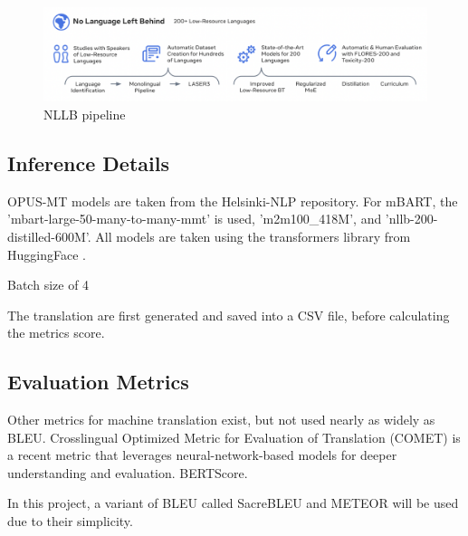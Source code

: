 \documentclass[a4paper]{article}
\begin{document}
\begin{figure}[htbp]
    \centering
    \includegraphics[width=0.9\linewidth]{images/nllb.png}
    \caption{NLLB pipeline \cite{nllb200-2020}}
    \label{fig:nllb}
\end{figure}


\subsection{Inference Details}

OPUS-MT models are taken from the Helsinki-NLP repository. For mBART, the 'mbart-large-50-many-to-many-mmt' is used, 'm2m100\_418M', and 'nllb-200-distilled-600M'. All models are taken using the transformers \cite{wolf-etal-2020-transformers} library from HuggingFace \cite{huggingface}.

Batch size of 4

The translation are first generated and saved into a CSV file, before calculating the metrics score.



\subsection{Evaluation Metrics}

Other metrics for machine translation exist, but not used nearly as widely as BLEU. Crosslingual Optimized Metric for Evaluation of Translation (COMET) \cite{rei-2020-comet} is a recent metric that leverages neural-network-based models for deeper understanding and evaluation. BERTScore.

In this project, a variant of BLEU called SacreBLEU and METEOR will be used due to their simplicity.
\end{document}
